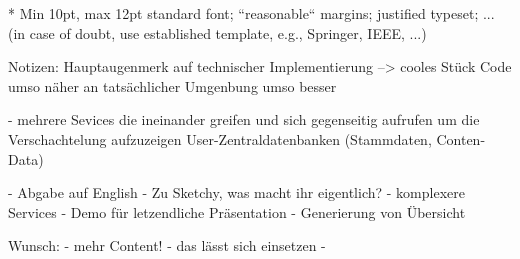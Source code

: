 *
Min 10pt, max 12pt standard font; “reasonable“ margins; justified
typeset; ... (in case of doubt, use established template, e.g., Springer,
IEEE, ...)


Notizen: 
Hauptaugenmerk auf technischer Implementierung --> cooles Stück Code umso näher an tatsächlicher Umgenbung umso besser

- mehrere Sevices die ineinander greifen und sich gegenseitig aufrufen um die Verschachtelung aufzuzeigen
User-Zentraldatenbanken (Stammdaten, Conten-Data) 


- Abgabe auf English 
- Zu Sketchy, was macht ihr eigentlich? 
- komplexere Services 
- Demo für letzendliche Präsentation
- Generierung von Übersicht

Wunsch: 
 - mehr Content! 
   - das lässt sich einsetzen
 - 
  